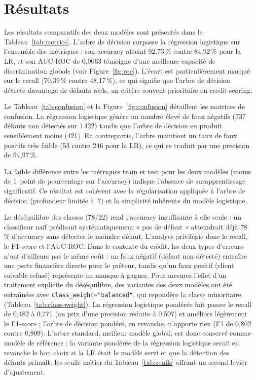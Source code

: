 \documentclass[12pt,a4paper,openany]{report}
\begin{document}
\section{Résultats}

Les résultats comparatifs des deux modèles sont présentés dans le Tableau~\ref{tab:metrics}. L'arbre de décision surpasse la régression logistique sur l'ensemble des métriques : son accuracy atteint 92,73\,\% contre 84,92\,\% pour la LR, et son AUC-ROC de 0,9063 témoigne d'une meilleure capacité de discrimination globale (voir Figure~\ref{fig:roc}). L'écart est particulièrement marqué sur le recall (70,39\,\% contre 48,17\,\%), ce qui signifie que l'arbre de décision détecte davantage de défauts réels, un critère souvent prioritaire en credit scoring.

Le Tableau~\ref{tab:confusion} et la Figure~\ref{fig:confusion} détaillent les matrices de confusion. La régression logistique génère un nombre élevé de faux négatifs (737 défauts non détectés sur 1\,422) tandis que l'arbre de décision en produit sensiblement moins (421). En contrepartie, l'arbre maintient un taux de faux positifs très faible (53 contre 246 pour la LR), ce qui se traduit par une precision de 94,97\,\%.

La faible différence entre les métriques train et test pour les deux modèles (moins de 1~point de pourcentage sur l'accuracy) indique l'absence de surapprentissage significatif. Ce résultat est cohérent avec la régularisation appliquée à l'arbre de décision (profondeur limitée à~7) et la simplicité inhérente du modèle logistique.

Le déséquilibre des classes (78/22) rend l'accuracy insuffisante à elle seule : un classifieur naïf prédisant systématiquement « pas de défaut » atteindrait déjà 78\,\% d'accuracy sans détecter le moindre défaut. L'analyse privilégie donc le recall, le F1-score et l'AUC-ROC. Dans le contexte du crédit, les deux types d'erreurs n'ont d'ailleurs pas le même coût : un faux négatif (défaut non détecté) entraîne une perte financière directe pour le prêteur, tandis qu'un faux positif (client solvable refusé) représente un manque à gagner. Pour mesurer l'effet d'un traitement explicite du déséquilibre, des variantes des deux modèles ont été entraînées avec \texttt{class\_weight="balanced"}, qui repondère la classe minoritaire (Tableau~\ref{tab:class-weight}). La régression logistique pondérée fait passer le recall de 0,482 à 0,771 (au prix d'une precision réduite à 0,507) et améliore légèrement le F1-score ; l'arbre de décision pondéré, en revanche, n'apporte rien (F1 de 0,802 contre 0,809). L'arbre standard, meilleur modèle global, est donc conservé comme modèle de référence ; la variante pondérée de la régression logistique serait en revanche le bon choix si la LR était le modèle servi et que la détection des défauts primait, les seuils métier du Tableau~\ref{tab:seuils} offrant un second levier d'ajustement.
\end{document}
